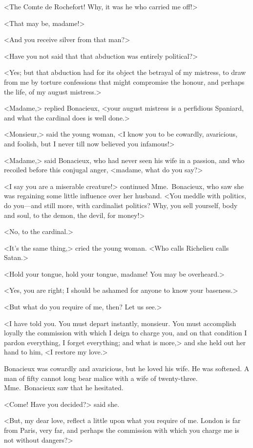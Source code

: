 <The Comte de Rochefort! Why, it was he who carried me off!> 

<That may be, madame!> 

<And you receive silver from that man?> 

<Have you not said that that abduction was entirely political?> 

<Yes; but that abduction had for its object the betrayal of my mistress, to draw from me by torture confessions that might compromise the honour, and perhaps the life, of my august mistress.> 

<Madame,> replied Bonacieux, <your august mistress is a perfidious Spaniard, and what the cardinal does is well done.> 

<Monsieur,> said the young woman, <I know you to be cowardly, avaricious, and foolish, but I never till now believed you infamous!> 

<Madame,> said Bonacieux, who had never seen his wife in a passion, and who recoiled before this conjugal anger, <madame, what do you say?> 

<I say you are a miserable creature!> continued Mme.~Bonacieux, who saw she was regaining some little influence over her husband. <You meddle with politics, do you—and still more, with cardinalist politics? Why, you sell yourself, body and soul, to the demon, the devil, for money!> 

<No, to the cardinal.> 

<It's the same thing,> cried the young woman. <Who calls Richelieu calls Satan.> 

<Hold your tongue, hold your tongue, madame! You may be overheard.> 

<Yes, you are right; I should be ashamed for anyone to know your baseness.> 

<But what do you require of me, then? Let us see.> 

<I have told you. You must depart instantly, monsieur. You must accomplish loyally the commission with which I deign to charge you, and on that condition I pardon everything, I forget everything; and what is more,> and she held out her hand to him, <I restore my love.> 

Bonacieux was cowardly and avaricious, but he loved his wife. He was softened. A man of fifty cannot long bear malice with a wife of twenty-three. Mme.~Bonacieux saw that he hesitated. 

<Come! Have you decided?> said she. 

<But, my dear love, reflect a little upon what you require of me. London is far from Paris, very far, and perhaps the commission with which you charge me is not without dangers?> 

